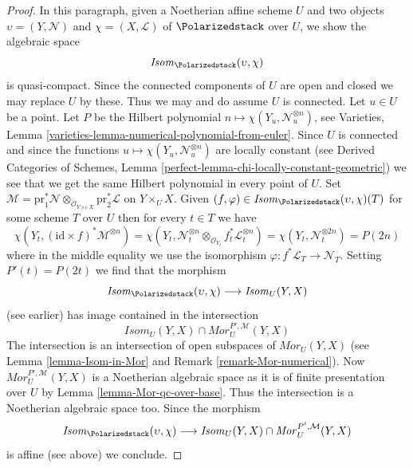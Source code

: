 \begin{proof}
\medskip\noindent
In this paragraph, given a Noetherian affine scheme $U$ and two objects
$\upsilon = (Y, \mathcal{N})$ and $\chi = (X, \mathcal{L})$
of $\Polarizedstack$ over $U$, we show the algebraic space
$$
\mathit{Isom}_{\Polarizedstack}(\upsilon, \chi)
$$
is quasi-compact. Since the connected components of $U$ are open and closed
we may replace $U$ by these. Thus we may and do assume $U$ is connected.
Let $u \in U$ be a point. Let $P$ be the Hilbert polynomial
$n \mapsto \chi(Y_u, \mathcal{N}_u^{\otimes n})$, see
Varieties, Lemma \ref{varieties-lemma-numerical-polynomial-from-euler}.
Since $U$ is connected and since
the functions $u \mapsto \chi(Y_u, \mathcal{N}_u^{\otimes n})$
are locally constant (see 
Derived Categories of Schemes, Lemma
\ref{perfect-lemma-chi-locally-constant-geometric})
we see that we get the same Hilbert polynomial in every point of $U$.
Set
$\mathcal{M} = \text{pr}_1^*\mathcal{N}
\otimes_{\mathcal{O}_{Y \times_U X}} \text{pr}_2^*\mathcal{L}$
on $Y \times_U X$. Given
$(f, \varphi) \in \mathit{Isom}_{\Polarizedstack}(\upsilon, \chi)(T)$
for some scheme $T$ over $U$ then for every $t \in T$ we have
$$
\chi(Y_t, (\text{id} \times f)^*\mathcal{M}^{\otimes n}) =
\chi(Y_t,
\mathcal{N}_t^{\otimes n} \otimes_{\mathcal{O}_{Y_t}}
f_t^*\mathcal{L}_t^{\otimes n}) =
\chi(Y_t, \mathcal{N}_t^{\otimes 2n}) = P(2n)
$$
where in the middle equality we use the isomorphism
$\varphi : f^*\mathcal{L}_T \to \mathcal{N}_T$.
Setting $P'(t) = P(2t)$ we find that the morphism
$$
\mathit{Isom}_{\Polarizedstack}(\upsilon, \chi)
\longrightarrow
\mathit{Isom}_U(Y, X)
$$
(see earlier) has image contained in the intersection
$$
\mathit{Isom}_U(Y, X) \cap \mathit{Mor}^{P', \mathcal{M}}_U(Y, X)
$$
The intersection is an intersection of open subspaces of
$\mathit{Mor}_U(Y, X)$ (see Lemma \ref{lemma-Isom-in-Mor} and
Remark \ref{remark-Mor-numerical}).
Now $\mathit{Mor}^{P', \mathcal{M}}_U(Y, X)$
is a Noetherian algebraic space as it is of finite
presentation over $U$ by Lemma \ref{lemma-Mor-qc-over-base}.
Thus the intersection
is a Noetherian algebraic space too. Since the morphism
$$
\mathit{Isom}_{\Polarizedstack}(\upsilon, \chi)
\longrightarrow
\mathit{Isom}_U(Y, X) \cap \mathit{Mor}^{P', \mathcal{M}}_U(Y, X)
$$
is affine (see above) we conclude.
\end{proof}
